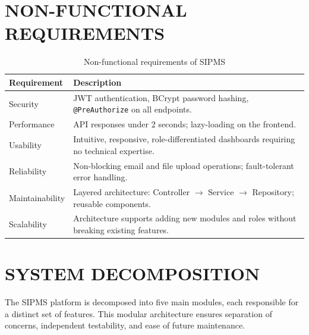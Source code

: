 \section{NON-FUNCTIONAL REQUIREMENTS}

\begin{table}[H]
\centering
\begin{tabular}{|p{3.5cm}|p{9.5cm}|}
\hline
\rowcolor{gray!20}
\textbf{Requirement} & \textbf{Description} \\
\hline
Security & JWT authentication, BCrypt password hashing, \texttt{@PreAuthorize} on all endpoints. \\
\hline
Performance & API responses under 2 seconds; lazy-loading on the frontend. \\
\hline
Usability & Intuitive, responsive, role-differentiated dashboards requiring no technical expertise. \\
\hline
Reliability & Non-blocking email and file upload operations; fault-tolerant error handling. \\
\hline
Maintainability & Layered architecture: Controller $\rightarrow$ Service $\rightarrow$ Repository; reusable components. \\
\hline
Scalability & Architecture supports adding new modules and roles without breaking existing features. \\
\hline
\end{tabular}
\caption{Non-functional requirements of SIPMS}
\end{table}

\section{SYSTEM DECOMPOSITION}

The SIPMS platform is decomposed into five main modules, each responsible for a distinct set of features. This modular architecture ensures separation of concerns, independent testability, and ease of future maintenance.

